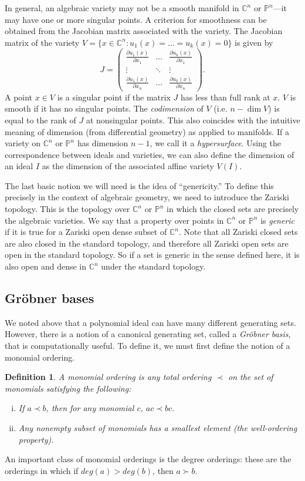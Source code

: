 \documentclass[aps,pra,notitlepage,preprintnumbers,11pt,tightenlines]{revtex4-1}
\newcommand{\CC}{\mathbb{C}}
\newcommand{\PP}{\mathbb{P}}
\newcommand{\pd}{\partial}
\newtheorem{definition}[theorem]{Definition}
\begin{document}
In general, an algebraic variety may not be a smooth manifold in
$\CC^n$ or $\PP^n$---it may have one or more singular points. A
criterion for smoothness can be obtained from the Jacobian matrix
associated with the variety. The Jacobian matrix of the variety $V =
\{x \in \CC^n: u_1(x) = \dots = u_k(x) = 0\}$ is given by
\[ J = \begin{pmatrix} \frac{\pd u_1(x)}{\pd x_1} & \dots & \frac{\pd
    u_k(x)}{\pd x_1} \\
  \vdots & \ddots & \vdots \\
   \frac{\pd u_1(x)}{\pd x_n} & \dots & \frac{\pd
    u_k(x)}{\pd x_n} \end{pmatrix}. \]
A point $x \in V$ is a singular point if the matrix $J$ has less than
full rank at $x$. $V$ is smooth if it has no singular points. The
\emph{codimension} of $V$ (i.e. $n-\dim V$) is equal to the rank of $J$ at nonsingular
points. This also coincides with the intuitive meaning of dimension (from differential geometry) as
applied to manifolds. If a variety on $\CC^n$ or $\PP^n$ has dimension $n-1$, we
call it a \emph{hypersurface}. Using the correspondence between ideals
and varieties, we can also define the dimension of an ideal $I$ as the
dimension of the associated affine variety $V(I)$.

The last basic notion we will need is the idea of ``genericity.'' To
define this precisely in the context of algebraic geometry, we need to
introduce the Zariski topology. This is the topology over $\CC^n$ or
$\PP^n$ in which the closed sets are precisely the algebraic
varieties. We say that a property over points in $\CC^n$ or $\PP^n$ is
\emph{generic} if it is true for a Zariski open dense subset of $\CC^n$. Note
that all Zariski closed sets are also closed in the standard
topology, and therefore all Zariski open sets are open in the standard
topology. So if a set is generic in the sense defined here, it is also
open and dense in $\CC^n$ under the standard topology.

\subsection{Gr\"{o}bner bases}
We noted above that a polynomial ideal can have many different
generating sets. However, there is a notion of a canonical generating
set, called a \emph{Gr\"{o}bner basis}, that is computationally
useful. To define it, we must first define the notion of a monomial
ordering.
\begin{definition}  
A monomial ordering is any total ordering $\prec$ on the set of
monomials satisfying the following:
\begin{enumerate}[(i)]
\item If $a \prec b$, then for any monomial $c$, $ac \prec bc$.
\item Any nonempty subset of monomials has a smallest element (the
  well-ordering property).
\end{enumerate}
\end{definition}
An important class of monomial orderings is the degree
orderings: these are the orderings in which if $deg(a) >
deg(b)$, then $a \succ b$.
\end{document}
